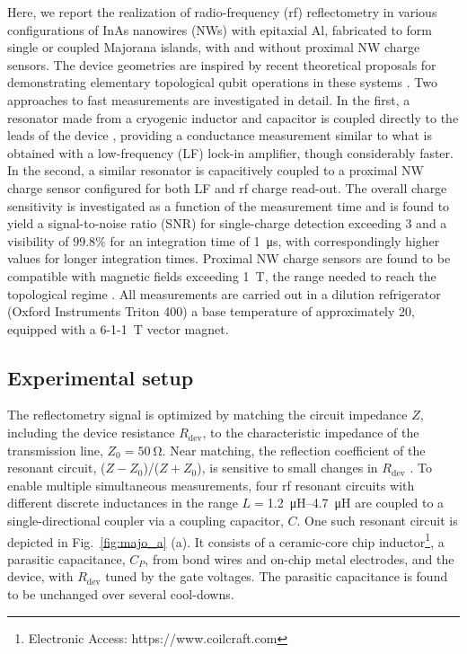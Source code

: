 Here, we report the realization of radio-frequency (rf) reflectometry in various configurations of InAs nanowires (NWs) with epitaxial Al, fabricated to form single or coupled Majorana islands, with and without proximal NW charge sensors. The device geometries are inspired by recent theoretical proposals for demonstrating elementary topological qubit operations in these systems \cite{AasenPRX16, PhysRevB.94.235446, Plugge, PhysRevB.95.235305}. Two approaches to fast measurements are investigated in detail. In the first, a resonator made from a cryogenic inductor and capacitor is coupled directly to the leads of the device \cite{karl1,PhysRevLett.109.166804,karl3}, providing a conductance measurement similar to what is obtained with a low-frequency (LF) lock-in amplifier, though considerably faster. In the second, a similar resonator is capacitively coupled to a proximal NW charge sensor configured for both LF and rf charge read-out. The overall charge sensitivity is investigated as a function of the measurement time and is found to yield a signal-to-noise ratio (SNR) for single-charge detection exceeding 3 and a visibility of $99.8\%$ for an integration time of \SI{1}{\micro\second}, with correspondingly higher values for longer integration times. Proximal NW charge sensors are found to be compatible with magnetic fields exceeding \SI{1}{\tesla}, the range needed to reach the topological regime \cite{Mourik1003,MT1,nature26142,AlbretchNature}. All measurements are carried out in a dilution refrigerator (Oxford Instruments Triton 400) a base temperature of approximately \SI{20}{\mk}, equipped with a 6-1-1~\si{\tesla} vector magnet.

\subsection{Experimental setup}

The reflectometry signal is optimized by matching the circuit impedance $Z$, including the device resistance $R_\textrm{dev}$, to the characteristic impedance of the transmission line, $Z_0 = \SI{50}{\ohm}$. Near matching, the reflection coefficient of the resonant circuit, ($Z-Z_{0}$)/($Z+Z_{0}$), is sensitive to small changes in $R_\textrm{dev}$ \cite{Reilly:2007ig,PhysRevApplied.5.034011}. To enable multiple simultaneous measurements, four rf resonant circuits with different discrete inductances in the range $L = $\SIrange{1.2}{4.7}{\micro\henry} are coupled to a single-directional coupler via a coupling capacitor, $C$. One such resonant circuit is depicted in Fig.~\ref{fig:majo_a} (a). It consists of a ceramic-core chip inductor\footnote{Electronic Access: https://www.coilcraft.com},  a parasitic capacitance, $C_P$, from bond wires and on-chip metal electrodes, and the device, with $R_\textrm{dev}$ tuned by the gate voltages. The parasitic capacitance is found to be unchanged over several cool-downs.

